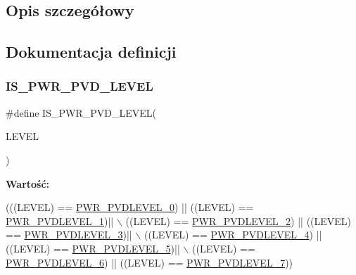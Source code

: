 \subsection{Opis szczegółowy}


\subsection{Dokumentacja definicji}
\mbox{\label{group___p_w_r___i_s___p_w_r___definitions_gabac4485a57abc97aad91eaa0b65ae927}} 
\subsubsection{\texorpdfstring{I\+S\+\_\+\+P\+W\+R\+\_\+\+P\+V\+D\+\_\+\+L\+E\+V\+EL}{IS\_PWR\_PVD\_LEVEL}}
{\footnotesize\ttfamily \#define I\+S\+\_\+\+P\+W\+R\+\_\+\+P\+V\+D\+\_\+\+L\+E\+V\+EL(\begin{DoxyParamCaption}\item[{}]{L\+E\+V\+EL }\end{DoxyParamCaption})}

{\bfseries Wartość\+:}
\begin{DoxyCode}
(((LEVEL) == \hyperlink{group___p_w_r___p_v_d__detection__level_gaddf4616a143ac3481f3043f2a4c21c18}{PWR\_PVDLEVEL\_0}) || ((LEVEL) == \hyperlink{group___p_w_r___p_v_d__detection__level_ga06e55b20a8777594f1a91ee71fac1f79}{PWR\_PVDLEVEL\_1})|| \(\backslash\)
                                 ((LEVEL) == \hyperlink{group___p_w_r___p_v_d__detection__level_gab26bb78650bbaef26ac9f9123c791cc7}{PWR\_PVDLEVEL\_2}) || ((LEVEL) == 
      \hyperlink{group___p_w_r___p_v_d__detection__level_ga7b751743b3e29c237e6a0e1d7bdd0503}{PWR\_PVDLEVEL\_3})|| \(\backslash\)
                                 ((LEVEL) == \hyperlink{group___p_w_r___p_v_d__detection__level_ga03c0d3ae547deb1a51b8acafac101698}{PWR\_PVDLEVEL\_4}) || ((LEVEL) == 
      \hyperlink{group___p_w_r___p_v_d__detection__level_ga46a1476440945c2b6426b4973172f24b}{PWR\_PVDLEVEL\_5})|| \(\backslash\)
                                 ((LEVEL) == \hyperlink{group___p_w_r___p_v_d__detection__level_ga5dda7d0ac3fd3d606666455ca3c8f537}{PWR\_PVDLEVEL\_6}) || ((LEVEL) == 
      \hyperlink{group___p_w_r___p_v_d__detection__level_ga2c5cd8dd26b13bdf0164c1f7596b4bfd}{PWR\_PVDLEVEL\_7}))
\end{DoxyCode}


